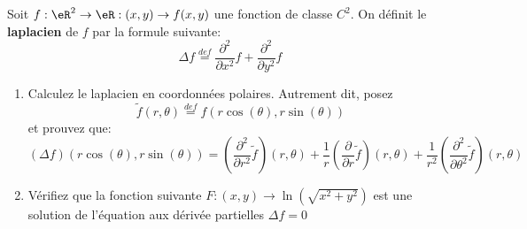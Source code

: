 
\begin{exercice}\label{exo0061}

Soit $f:\eR^2 \rightarrow \eR: (x, y) \rightarrow f(x,y)$ une
fonction de classe $C^2$. On définit le {\bf laplacien} de $f$ par la
formule suivante:
\[
\Delta f \stackrel{def}= \frac{\partial ^2}{\partial x^2 } f +
\frac{\partial^2}{\partial y^2} f
\]
\begin{enumerate}
\item
Calculez le laplacien en coordonnées polaires. Autrement dit, posez 
\begin{equation}
\tilde{f} (r, \theta) \stackrel{def}= f(r\cos(\theta),r\sin(\theta))
\end{equation}
et prouvez que:
\[
(\Delta f)(r\cos(\theta), r\sin(\theta))
= (\frac{\partial^2}{\partial r^2}\tilde{f})(r, \theta)
+ \frac{1}{r} (\frac{\partial}{\partial r}\tilde{f})(r,\theta)
+ \frac{1}{r^2} (\frac{\partial^2}{\partial \theta^2}\tilde{f})(r,\theta)
\]
\item
Vérifiez que la fonction suivante $F:( x,y) \rightarrow \ln(\sqrt{x^2+y^2})
$ est une solution de l'équation aux dérivée partielles $\Delta f =0$
\end{enumerate}
 
\end{exercice}
